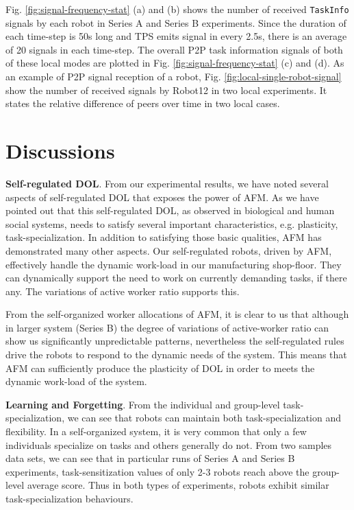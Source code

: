 \documentclass[final,5p,times,twocolumn]{elsarticle}
\begin{document}
Fig. \ref{fig:signal-frequency-stat} (a) and (b) shows the number of received \texttt{TaskInfo} signals by each robot in Series A and Series B experiments. Since the duration of each time-step is 50s long and TPS emits signal in every 2.5s, there is an average of 20 signals in each time-step. The overall P2P task information signals of both of these local modes are plotted in Fig. \ref{fig:signal-frequency-stat} (c) and (d). As an example of P2P signal reception of a robot,  Fig. \ref{fig:local-single-robot-signal} show the number of received signals by Robot12 in two local experiments. It states the relative difference of peers over time in two local cases.
\section{Discussions}
\label{sec:discuss}
\textbf{Self-regulated DOL}. From our experimental results, we have noted several aspects of self-regulated DOL that exposes the power of AFM. As we have pointed out that this self-regulated DOL, as observed in biological and human social systems, needs to satisfy several important characteristics, e.g. plasticity, task-specialization. In addition to satisfying those basic qualities, AFM has demonstrated many other aspects. Our self-regulated robots, driven by AFM, effectively handle the dynamic work-load in our manufacturing shop-floor. They can dynamically support the need to work on currently demanding tasks, if there any. The variations of active worker ratio supports this. 

From the self-organized worker allocations of AFM, it is clear to us that although in larger system (Series B) the degree of variations of active-worker ratio can show us significantly unpredictable patterns, nevertheless the self-regulated rules drive the robots to respond to the dynamic needs of the system. This means that AFM can sufficiently produce the plasticity of DOL in order to meets the dynamic work-load of the system.

\textbf{Learning and Forgetting}. From the individual and group-level task-\\ specialization, we can see that robots can maintain both task-specialization and flexibility. In a self-organized system, it is very common that only a few individuals specialize on tasks and others generally do not. From two samples data sets, we can see that in particular runs of Series A and Series B experiments, task-sensitization values of  only 2-3 robots reach above the group-level average score. Thus in both types of experiments, robots exhibit similar task-specialization behaviours. 
\end{document}
